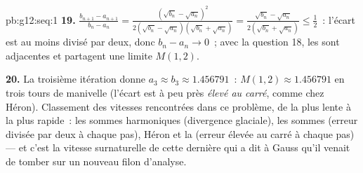 \begin{solution}{pb:g12:seq:1}
\textbf{19.} $\frac{b_{n+1} - a_{n+1}}{b_n - a_n} =
\frac{(\sqrt{b_n} - \sqrt{a_n})^2}
{2(\sqrt{b_n} - \sqrt{a_n})(\sqrt{b_n} + \sqrt{a_n})}
= \frac{\sqrt{b_n} - \sqrt{a_n}}{2(\sqrt{b_n} + \sqrt{a_n})}
\leq \frac12$~: l'écart est au moins divisé par deux, donc
$b_n - a_n \to 0$~; avec la question 18, les  sont adjacentes
et partagent une limite $M(1, 2)$.

\textbf{20.} La troisième itération donne
$a_3 \approx b_3 \approx 1.456791$~: $M(1, 2) \approx 1.456791$ en
trois tours de manivelle (l'écart est à peu près \emph{élevé au
carré}, comme chez Héron). Classement des vitesses rencontrées dans
ce problème, de la plus lente à la plus rapide~: les sommes
harmoniques (divergence glaciale), les sommes  (erreur
divisée par deux à chaque pas), Héron et la 
 (erreur élevée au carré à chaque pas) ---
et c'est la vitesse surnaturelle de cette dernière qui a dit à Gauss
qu'il venait de tomber sur un nouveau filon d'analyse.
\end{solution}
